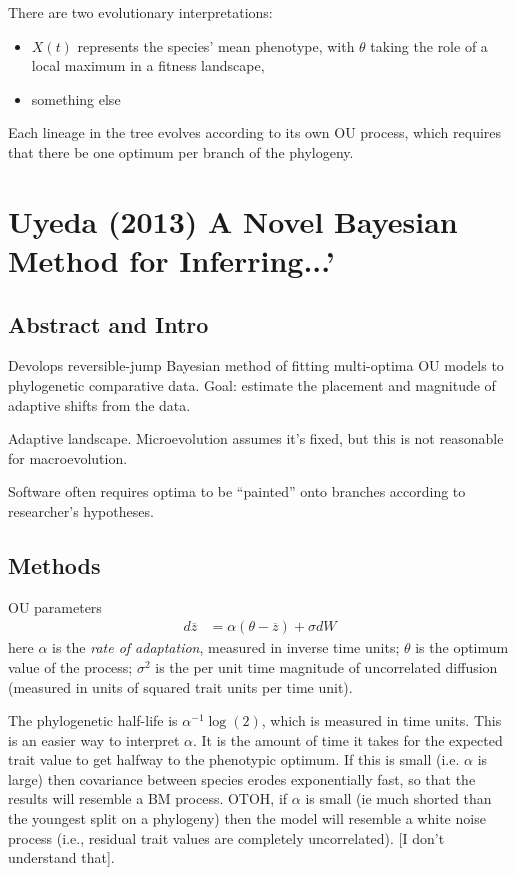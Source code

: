 \documentclass{article}
\begin{document}
There are two evolutionary interpretations:
\begin{itemize}
\item $X(t)$ represents the species' mean phenotype, with $\theta$ taking the role of a local maximum in a fitness landscape, 
\item something else
\end{itemize}
Each lineage in the tree evolves according to its own OU process, which requires
that there be one optimum per branch of the phylogeny.



\section{Uyeda (2013) A Novel Bayesian Method for Inferring...'}

\subsection{Abstract and Intro}
Devolops reversible-jump Bayesian method of fitting multi-optima OU models to
phylogenetic comparative data. Goal: estimate the placement and magnitude of
adaptive shifts from the data.

Adaptive landscape. Microevolution assumes it's fixed, but this is not
reasonable for macroevolution.

Software often requires optima to be ``painted'' onto branches according to
researcher's hypotheses.

\subsection{Methods}

OU parameters
\begin{align*} d\overline{z} &= \alpha(\theta-\overline{z})+\sigma dW
\end{align*} here $\alpha$ is the \textit{rate of adaptation}, measured in
inverse time units; $\theta$ is the optimum value of the process; $\sigma^{2}$
is the per unit time magnitude of uncorrelated diffusion (measured in units of
squared trait units per time unit).

The phylogenetic half-life is $\alpha^{-1}\log (2)$, which is measured in time
units. This is an easier way to interpret $\alpha$. It is the amount of time it
takes for the expected trait value to get halfway to the phenotypic optimum. If
this is small (i.e. $\alpha$ is large) then covariance between species erodes
exponentially fast, so that the results will resemble a BM process. OTOH, if
$\alpha$ is small (ie much shorted than the youngest split on a phylogeny) then
the model will resemble a white noise process (i.e., residual trait values are
completely uncorrelated). [I don't understand that].
\end{document}
